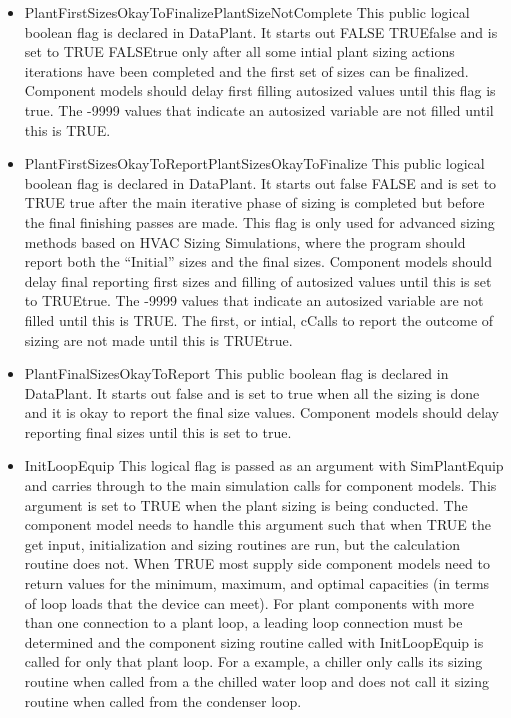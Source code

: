 \begin{itemize}
\item
  PlantFirstSizesOkayToFinalizePlantSizeNotComplete This public logical boolean flag is declared in DataPlant. It starts out FALSE TRUEfalse and is set to TRUE FALSEtrue only after all some intial plant sizing actions iterations have been completed and the first set of sizes can be finalized. Component models should delay first filling autosized values until this flag is true. The -9999 values that indicate an autosized variable are not filled until this is TRUE.
\item
  PlantFirstSizesOkayToReportPlantSizesOkayToFinalize This public logical boolean flag is declared in DataPlant. It starts out false FALSE and is set to TRUE true after the main iterative phase of sizing is completed but before the final finishing passes are made. This flag is only used for advanced sizing methods based on HVAC Sizing Simulations, where the program should report both the ``Initial'' sizes and the final sizes. Component models should delay final reporting first sizes and filling of autosized values until this is set to TRUEtrue. The -9999 values that indicate an autosized variable are not filled until this is TRUE. The first, or intial, cCalls to report the outcome of sizing are not made until this is TRUEtrue.
\item
  PlantFinalSizesOkayToReport This public boolean flag is declared in DataPlant. It starts out false and is set to true when all the sizing is done and it is okay to report the final size values. Component models should delay reporting final sizes until this is set to true.
\item
  InitLoopEquip This logical flag is passed as an argument with SimPlantEquip and carries through to the main simulation calls for component models. This argument is set to TRUE when the plant sizing is being conducted. The component model needs to handle this argument such that when TRUE the get input, initialization and sizing routines are run, but the calculation routine does not. When TRUE most supply side component models need to return values for the minimum, maximum, and optimal capacities (in terms of loop loads that the device can meet). For plant components with more than one connection to a plant loop, a leading loop connection must be determined and the component sizing routine called with InitLoopEquip is called for only that plant loop. For a example, a chiller only calls its sizing routine when called from a the chilled water loop and does not call it sizing routine when called from the condenser loop.

\end{itemize}
